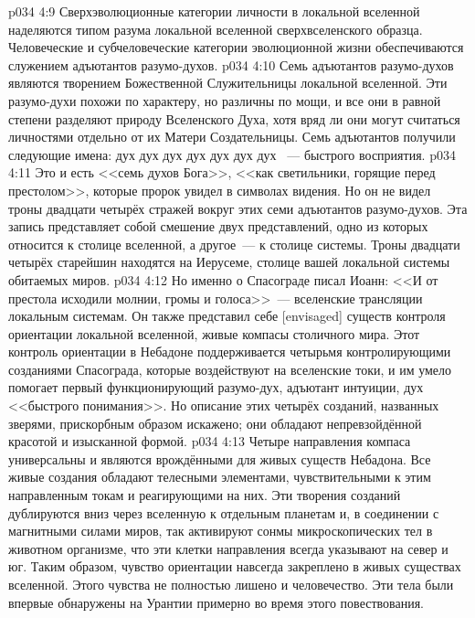 \vs p034 4:9 Сверхэволюционные категории личности в локальной вселенной наделяются типом разума локальной вселенной сверхвселенского образца. Человеческие и субчеловеческие категории эволюционной жизни обеспечиваются служением адъютантов разумо\hyp{}духов.
\vs p034 4:10 \pc Семь адъютантов разумо\hyp{}духов являются творением Божественной Служительницы локальной вселенной. Эти разумо\hyp{}духи похожи по характеру, но различны по мощи, и все они в равной степени разделяют природу Вселенского Духа, хотя вряд ли  они могут считаться личностями отдельно от их Матери Создательницы. Семь адъютантов получили следующие имена: дух  дух  дух  дух  дух  дух  дух ~--- быстрого восприятия.
\vs p034 4:11 \pc Это и есть <<семь духов Бога>>, <<как светильники, горящие перед престолом>>, которые пророк увидел в символах видения. Но он не видел троны двадцати четырёх стражей вокруг этих семи адъютантов разумо\hyp{}духов. Эта запись представляет собой смешение двух представлений, одно из которых относится к столице вселенной, а другое~--- к столице системы. Троны двадцати четырёх старейшин находятся на Иерусеме, столице вашей локальной системы обитаемых миров.
\vs p034 4:12 Но именно о Спасограде писал Иоанн: <<И от престола исходили молнии, громы и голоса>>~--- вселенские трансляции локальным системам. Он также представил себе [envisaged] существ контроля ориентации локальной вселенной, живые компасы столичного мира. Этот контроль ориентации в Небадоне поддерживается четырьмя контролирующими созданиями Спасограда, которые воздействуют на вселенские токи, и им умело помогает первый функционирующий разумо\hyp{}дух, адъютант интуиции, дух <<быстрого понимания>>. Но описание этих четырёх созданий, названных зверями, прискорбным образом искажено; они обладают непревзойдённой красотой и изысканной формой.
\vs p034 4:13 Четыре направления компаса универсальны и являются врождёнными для живых существ Небадона. Все живые создания обладают телесными элементами, чувствительными к этим направленным токам и реагирующими на них. Эти творения созданий дублируются вниз через вселенную к отдельным планетам и, в соединении с магнитными силами миров, так активируют сонмы микроскопических тел в животном организме, что эти клетки направления всегда указывают на север и юг. Таким образом, чувство ориентации навсегда закреплено в живых существах вселенной. Этого чувства не полностью лишено и человечество. Эти тела были впервые обнаружены на Урантии примерно во время этого повествования.
